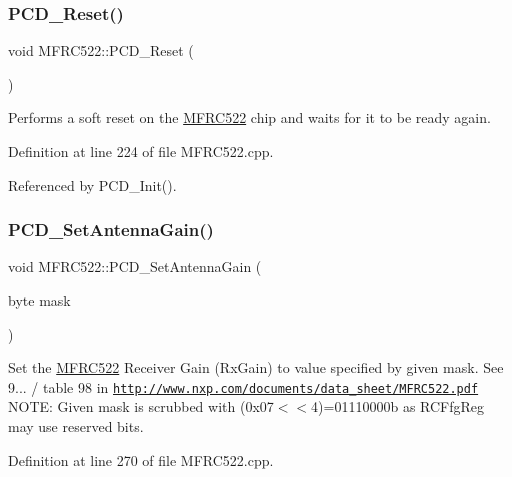 \mbox{\label{class_m_f_r_c522_a9886678ea0a65021bf602cfb110caa15}} 
\subsubsection{\texorpdfstring{P\+C\+D\+\_\+\+Reset()}{PCD\_Reset()}}
{\footnotesize\ttfamily void M\+F\+R\+C522\+::\+P\+C\+D\+\_\+\+Reset (\begin{DoxyParamCaption}{ }\end{DoxyParamCaption})}

Performs a soft reset on the \hyperlink{class_m_f_r_c522}{M\+F\+R\+C522} chip and waits for it to be ready again. 

Definition at line 224 of file M\+F\+R\+C522.\+cpp.



Referenced by P\+C\+D\+\_\+\+Init().

\mbox{\label{class_m_f_r_c522_a5ce84dd855f2ae297dd00fafaf62ef78}} 
\subsubsection{\texorpdfstring{P\+C\+D\+\_\+\+Set\+Antenna\+Gain()}{PCD\_SetAntennaGain()}}
{\footnotesize\ttfamily void M\+F\+R\+C522\+::\+P\+C\+D\+\_\+\+Set\+Antenna\+Gain (\begin{DoxyParamCaption}\item[{byte}]{mask }\end{DoxyParamCaption})}

Set the \hyperlink{class_m_f_r_c522}{M\+F\+R\+C522} Receiver Gain (Rx\+Gain) to value specified by given mask. See 9... / table 98 in \href{http://www.nxp.com/documents/data_sheet/MFRC522.pdf}{\tt http\+://www.\+nxp.\+com/documents/data\+\_\+sheet/\+M\+F\+R\+C522.\+pdf} N\+O\+TE\+: Given mask is scrubbed with (0x07$<$$<$4)=01110000b as R\+C\+Ffg\+Reg may use reserved bits. 

Definition at line 270 of file M\+F\+R\+C522.\+cpp.

\mbox{\label{class_m_f_r_c522_adef7552eb0089496522153e7bad19d63}} 
